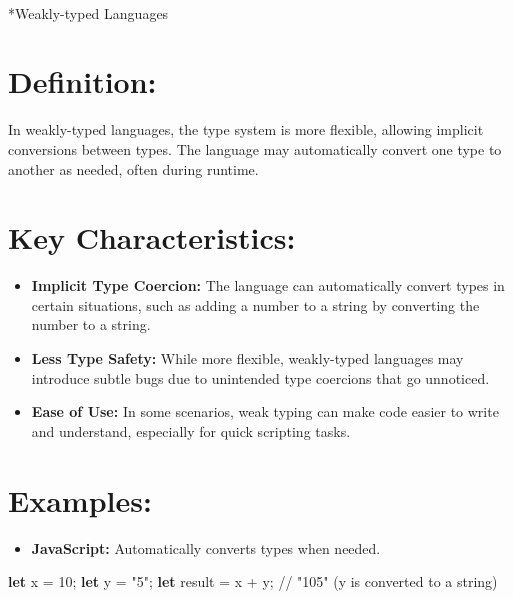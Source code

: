 \documentclass[
  letterpaper,
  DIV=11,
  numbers=noendperiod]{scrreprt}
\makeatletter
\let\oldparagraph\paragraph
\renewcommand{\paragraph}{
    \@ifstar
      \xxxParagraphStar
      \xxxParagraphNoStar
  }
\newcommand{\xxxParagraphStar}[1]{\oldparagraph*{#1}\mbox{}}
\newcommand{\xxxParagraphNoStar}[1]{\oldparagraph{#1}\mbox{}}
\newenvironment{Shaded}{\begin{snugshade}}{\end{snugshade}}
\newcommand{\CommentTok}[1]{\textcolor[rgb]{0.37,0.37,0.37}{#1}}
\newcommand{\DecValTok}[1]{\textcolor[rgb]{0.68,0.00,0.00}{#1}}
\newcommand{\KeywordTok}[1]{\textcolor[rgb]{0.00,0.23,0.31}{\textbf{#1}}}
\newcommand{\NormalTok}[1]{\textcolor[rgb]{0.00,0.23,0.31}{#1}}
\newcommand{\OperatorTok}[1]{\textcolor[rgb]{0.37,0.37,0.37}{#1}}
\newcommand{\StringTok}[1]{\textcolor[rgb]{0.13,0.47,0.30}{#1}}
\providecommand{\tightlist}{%
  \setlength{\itemsep}{0pt}\setlength{\parskip}{0pt}}
\makeatother
\begin{document}
\paragraph*{Weakly-typed Languages}\label{weakly-typed-languages}

\section{Definition:}

In weakly-typed languages, the type system is more flexible, allowing
implicit conversions between types. The language may automatically
convert one type to another as needed, often during runtime.

\section{Key Characteristics:}

\begin{itemize}
\tightlist
\item
  \textbf{Implicit Type Coercion:} The language can automatically
  convert types in certain situations, such as adding a number to a
  string by converting the number to a string.
\item
  \textbf{Less Type Safety:} While more flexible, weakly-typed languages
  may introduce subtle bugs due to unintended type coercions that go
  unnoticed.
\item
  \textbf{Ease of Use:} In some scenarios, weak typing can make code
  easier to write and understand, especially for quick scripting tasks.
\end{itemize}

\section{Examples:}

\begin{itemize}
\tightlist
\item
  \textbf{JavaScript:} Automatically converts types when needed.
\end{itemize}

\begin{Shaded}
\begin{Highlighting}[]
\KeywordTok{let}\NormalTok{ x }\OperatorTok{=} \DecValTok{10}\OperatorTok{;}
\KeywordTok{let}\NormalTok{ y }\OperatorTok{=} \StringTok{"5"}\OperatorTok{;}
\KeywordTok{let}\NormalTok{ result }\OperatorTok{=}\NormalTok{ x }\OperatorTok{+}\NormalTok{ y}\OperatorTok{;} \CommentTok{// "105" (y is converted to a string)}
\end{Highlighting}
\end{Shaded}
\end{document}
